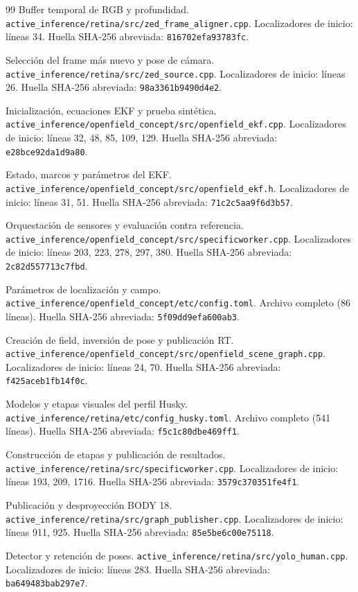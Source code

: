\documentclass[11pt,a4paper]{article}
\newcommand{\code}[1]{\nolinkurl{#1}}
\newcommand{\file}[1]{\nolinkurl{#1}}
\begin{document}
\begin{thebibliography}{99}
 Buffer temporal de RGB y profundidad.
\file{active_inference/retina/src/zed_frame_aligner.cpp}.
Localizadores de inicio: líneas 34. Huella SHA-256 abreviada: \code{816702efa93783fc}.

 Selección del frame más nuevo y pose de cámara.
\file{active_inference/retina/src/zed_source.cpp}.
Localizadores de inicio: líneas 26. Huella SHA-256 abreviada: \code{98a3361b9490d4e2}.

 Inicialización, ecuaciones EKF y prueba sintética.
\file{active_inference/openfield_concept/src/openfield_ekf.cpp}.
Localizadores de inicio: líneas 32, 48, 85, 109, 129. Huella SHA-256 abreviada: \code{e28bce92da1d9a80}.

 Estado, marcos y parámetros del EKF.
\file{active_inference/openfield_concept/src/openfield_ekf.h}.
Localizadores de inicio: líneas 31, 51. Huella SHA-256 abreviada: \code{71c2c5aa9f6d3b57}.

 Orquestación de sensores y evaluación contra referencia.
\file{active_inference/openfield_concept/src/specificworker.cpp}.
Localizadores de inicio: líneas 203, 223, 278, 297, 380. Huella SHA-256 abreviada: \code{2c82d557713c7fbd}.

 Parámetros de localización y campo.
\file{active_inference/openfield_concept/etc/config.toml}.
Archivo completo (86 líneas). Huella SHA-256 abreviada: \code{5f09dd9efa600ab3}.

 Creación de field, inversión de pose y publicación RT.
\file{active_inference/openfield_concept/src/openfield_scene_graph.cpp}.
Localizadores de inicio: líneas 24, 70. Huella SHA-256 abreviada: \code{f425aceb1fb14f0c}.

 Modelos y etapas visuales del perfil Husky.
\file{active_inference/retina/etc/config_husky.toml}.
Archivo completo (541 líneas). Huella SHA-256 abreviada: \code{f5c1c80dbe469ff1}.

 Construcción de etapas y publicación de resultados.
\file{active_inference/retina/src/specificworker.cpp}.
Localizadores de inicio: líneas 193, 209, 1716. Huella SHA-256 abreviada: \code{3579c370351fe4f1}.

 Publicación y desproyección BODY 18.
\file{active_inference/retina/src/graph_publisher.cpp}.
Localizadores de inicio: líneas 911, 925. Huella SHA-256 abreviada: \code{85e5be6c00e75118}.

 Detector y retención de poses.
\file{active_inference/retina/src/yolo_human.cpp}.
Localizadores de inicio: líneas 283. Huella SHA-256 abreviada: \code{ba649483bab297e7}.


\end{thebibliography}
\end{document}
